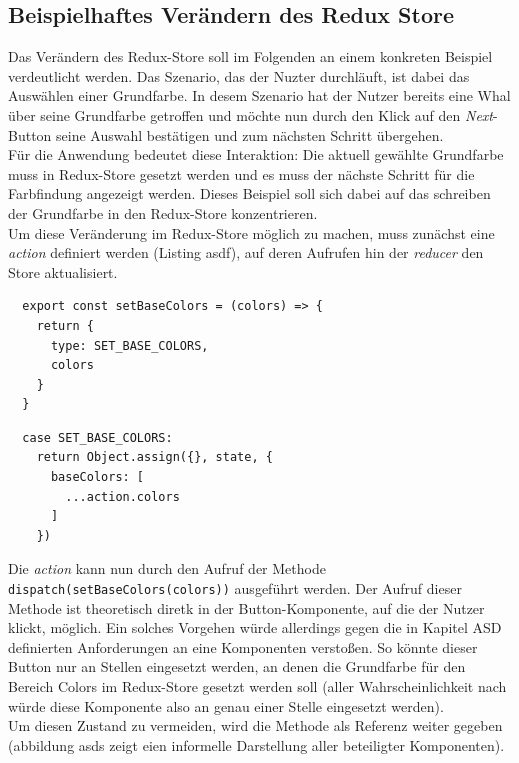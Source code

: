 \subsection{Beispielhaftes Verändern des Redux Store}
Das Verändern des Redux-Store soll im Folgenden an einem konkreten Beispiel verdeutlicht werden. Das Szenario, das der Nuzter durchläuft, ist dabei das Auswählen einer Grundfarbe. In desem Szenario hat der Nutzer bereits eine Whal über seine Grundfarbe getroffen und möchte nun durch den Klick auf den \textit{Next}-Button seine Auswahl bestätigen und zum nächsten Schritt übergehen.\\
Für die Anwendung bedeutet diese Interaktion: Die aktuell gewählte Grundfarbe muss in Redux-Store gesetzt werden und es muss der nächste Schritt für die Farbfindung angezeigt werden. Dieses Beispiel soll sich dabei auf das schreiben der Grundfarbe in den Redux-Store konzentrieren.\\

Um diese Veränderung im Redux-Store möglich zu machen, muss zunächst eine \textit{action} definiert werden (Listing asdf), auf deren Aufrufen hin der \textit{reducer} den Store aktualisiert.

\begin{lstlisting}
  export const setBaseColors = (colors) => {
    return {
      type: SET_BASE_COLORS,
      colors
    }
  }
\end{lstlisting}

\begin{lstlisting}
  case SET_BASE_COLORS:
    return Object.assign({}, state, {
      baseColors: [
        ...action.colors
      ]
    })
\end{lstlisting}

Die \textit{action} kann nun durch den Aufruf der Methode \verb|dispatch(setBaseColors(colors))| ausgeführt werden. Der Aufruf dieser Methode ist theoretisch diretk in der Button-Komponente, auf die der Nutzer klickt, möglich. Ein solches Vorgehen würde allerdings gegen die in Kapitel ASD definierten Anforderungen an eine Komponenten verstoßen. So könnte dieser Button nur an Stellen eingesetzt werden, an denen die Grundfarbe für den Bereich Colors im Redux-Store gesetzt werden soll (aller Wahrscheinlichkeit nach würde diese Komponente also an genau einer Stelle eingesetzt werden).\\
Um diesen Zustand zu vermeiden, wird die Methode als Referenz weiter gegeben (abbildung asds zeigt eien informelle Darstellung aller beteiligter Komponenten).

